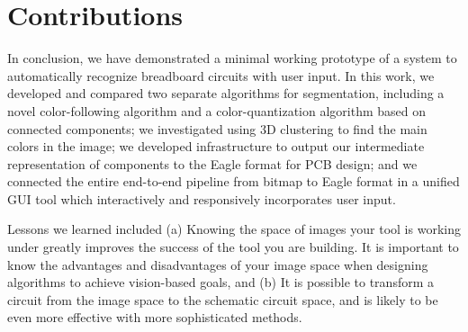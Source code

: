 \documentclass[10pt,twocolumn,letterpaper]{article}
\begin{document}
\section{Contributions}

In conclusion, we have demonstrated a minimal working prototype of a
system to automatically recognize breadboard circuits with user
input. In this work, we developed and compared two separate algorithms
for segmentation, including a novel color-following algorithm and a
color-quantization algorithm based on connected components; we
investigated using 3D clustering to find the main colors in the image;
we developed infrastructure to output our intermediate representation
of components to the Eagle format for PCB design; and we connected the
entire end-to-end pipeline from bitmap to Eagle format in a unified
GUI tool which interactively and responsively incorporates user input.

Lessons we learned included (a) Knowing the space of images your tool
is working under greatly improves the success of the tool you are
building. It is important to know the advantages and disadvantages of
your image space when designing algorithms to achieve vision-based
goals, and (b) It is possible to transform a circuit from the image
space to the schematic circuit space, and is likely to be even more
effective with more sophisticated methods.

{\small


}
\end{document}
